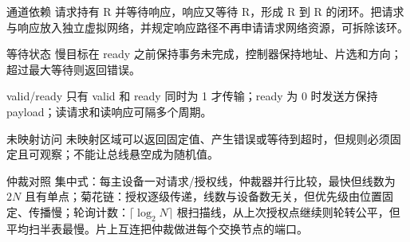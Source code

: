 \begin{chapteranswer}{通道依赖}
请求持有 R 并等待响应，响应又等待 R，形成 R 到 R 的闭环。把请求与响应放入独立虚拟网络，并规定响应路径不再申请请求网络资源，可拆除该环。
\end{chapteranswer}

\begin{chapteranswer}{等待状态}
慢目标在 ready 之前保持事务未完成，控制器保持地址、片选和方向；超过最大等待则返回错误。
\end{chapteranswer}

\begin{chapteranswer}{valid/ready}
只有 valid 和 ready 同时为 1 才传输；ready 为 0 时发送方保持 payload；读请求和读响应可隔多个周期。
\end{chapteranswer}

\begin{chapteranswer}{未映射访问}
未映射区域可以返回固定值、产生错误或等待到超时，但规则必须固定且可观察；不能让总线悬空成为随机值。
\end{chapteranswer}

\begin{chapteranswer}{仲裁对照}
集中式：每主设备一对请求/授权线，仲裁器并行比较，最快但线数为 $2N$ 且有单点；菊花链：授权逐级传递，线数与设备数无关，但优先级由位置固定、传播慢；轮询计数：$\lceil\log_2 N\rceil$ 根扫描线，从上次授权点继续则轮转公平，但平均扫半表最慢。片上互连把仲裁做进每个交换节点的端口。
\end{chapteranswer}
